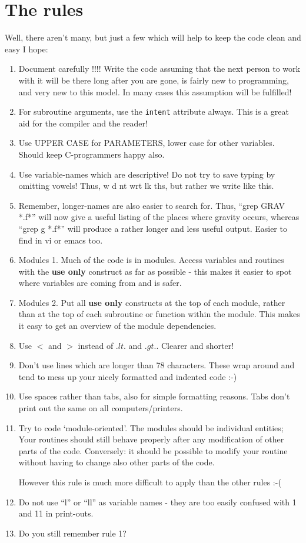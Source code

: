 \section{The rules}

Well, there aren't many, but just a few which will help to keep
the code clean and easy I hope:

\begin{enumerate}
\item
    Document carefully !!!!
    Write the code assuming that the next person to work with it will
    be there long after you are gone, is fairly new to programming,
    and very new to this model. In many cases this assumption will
    be fulfilled!
\item
    For subroutine arguments, use the {\tt intent} attribute always.
    This is a great aid for the compiler and the reader!
\item
    Use UPPER CASE for PARAMETERS, lower case for other variables.
    Should keep C-programmers happy also.
\item
    Use variable-names which are descriptive! Do not try to save
    typing by omitting vowels! Thus, w d nt wrt lk ths, but rather
    we write like this.
\item
    Remember, longer-names are also easier to search for. Thus,
    ``grep GRAV *.f*'' will now give a useful listing of the places where
    gravity occurs, whereas ``grep g *.f*'' will produce a rather longer 
    and less useful output. Easier to find in vi or emacs too.
\item Modules 1.
    Much of the code is in modules. Access variables and routines with
    the {\bf use only} construct as far as possible - this makes it
    easier to spot where variables are coming from and is safer.
\item Modules 2.
    Put all {\bf use only} constructs at the top of each module, rather than
    at the top of each subroutine or function within the module. This makes
    it easy to get an overview of the module dependencies.
\item
     Use $<$ and $>$ instead of $.lt.$ and $.gt.$. Clearer and shorter!
\item
    Don't use lines which are longer than 78 characters. These wrap
    around and tend to mess up your nicely formatted and indented code :-)
\item
    Use spaces rather than tabs, also for simple formatting reasons.
    Tabs don't print out the same on all computers/printers.
\item
    Try to code `module-oriented'. The modules should be individual
entities; Your routines should still behave properly after any
modification of other parts of the code.  Conversely: it should be
possible to modify your routine without having to change also other
parts of the code.

However this rule is much more difficult to apply than the other rules :-(


\item
    Do not use ``l'' or ``ll'' as variable names - they are too easily
    confused with 1 and 11 in print-outs. 
\item
    Do you still remember rule 1?
\end{enumerate}




